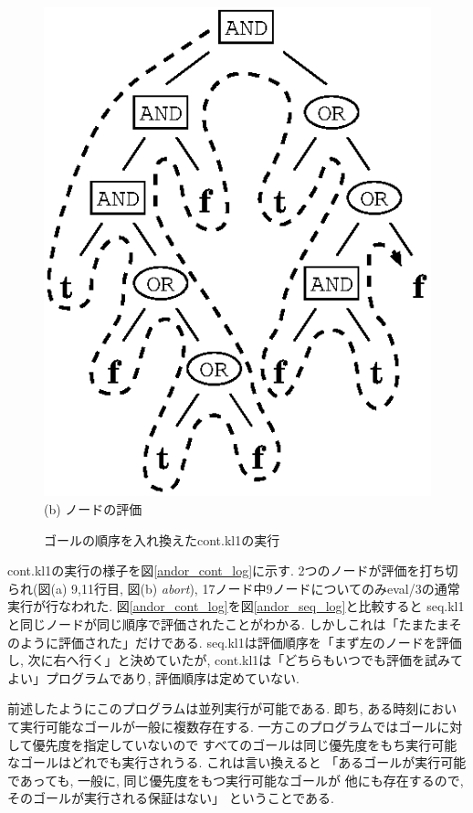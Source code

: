 \documentclass[a4,titlepage]{jsreport}
\begin{document}
\begin{figure}
\begin{center}
\includegraphics{fig/andor_tree2_cont_all.eps}\\
(b) ノードの評価
\caption{ゴールの順序を入れ換えたcont.kl1の実行}
\label{andor_cont_no_pruning_log}
\end{center}
\end{figure}

cont.kl1の実行の様子を図\ref{andor_cont_log}に示す.  
2つのノードが評価を打ち切られ(図(a) 9,11行目, 図(b) {\it abort\/}), 
17ノード中9ノードについてのみeval/3の通常実行が行なわれた.  
図\ref{andor_cont_log}を図\ref{andor_seq_log}と比較すると
seq.kl1と同じノードが同じ順序で評価されたことがわかる.  
しかしこれは「たまたまそのように評価された」だけである.  
seq.kl1は評価順序を「まず左のノードを評価し, 次に右へ行く」と決めていたが, 
cont.kl1は「どちらもいつでも評価を試みてよい」プログラムであり, 
評価順序は定めていない.  

前述したようにこのプログラムは並列実行が可能である.  
即ち, ある時刻において実行可能なゴールが一般に複数存在する.  
一方このプログラムではゴールに対して優先度を指定していないので
すべてのゴールは同じ優先度をもち実行可能なゴールはどれでも実行されうる.  
これは言い換えると
「あるゴールが実行可能であっても, 一般に, 同じ優先度をもつ実行可能なゴールが
他にも存在するので, そのゴールが実行される保証はない」
ということである.  
\end{document}

